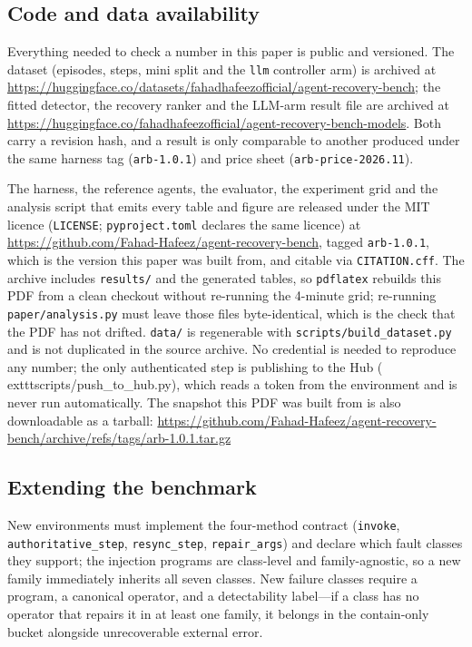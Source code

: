 \subsection{Code and data availability}

Everything needed to check a number in this paper is public and versioned. The dataset
(episodes, steps, mini split and the \texttt{llm} controller arm) is archived at
\url{https://huggingface.co/datasets/fahadhafeezofficial/agent-recovery-bench}; the fitted
detector, the recovery ranker and the LLM-arm result file are archived at
\url{https://huggingface.co/fahadhafeezofficial/agent-recovery-bench-models}. Both carry a
revision hash, and a result is only comparable to another produced under the same harness tag
(\texttt{arb-1.0.1}) and price sheet (\texttt{arb-price-2026.11}).

The harness, the reference agents, the evaluator, the experiment grid and the analysis script
that emits every table and figure are released under the MIT licence (\texttt{LICENSE};
\texttt{pyproject.toml} declares the same licence) at
\url{https://github.com/Fahad-Hafeez/agent-recovery-bench}, tagged \texttt{arb-1.0.1}, which is the version this paper was built from, and citable via
\texttt{CITATION.cff}. The archive
includes \texttt{results/} and the generated tables, so \texttt{pdflatex} rebuilds this PDF
from a clean checkout without re-running the 4-minute grid; re-running
\texttt{paper/analysis.py} must leave those files byte-identical, which is the check that the
PDF has not drifted. \texttt{data/} is regenerable with \texttt{scripts/build\_dataset.py}
and is not duplicated in the source archive. No credential is needed to reproduce any number;
the only authenticated step is publishing to the Hub (	exttt{scripts/push\_to\_hub.py}), which
reads a token from the environment and is never run automatically. The snapshot this PDF was
built from is also downloadable as a tarball:
\url{https://github.com/Fahad-Hafeez/agent-recovery-bench/archive/refs/tags/arb-1.0.1.tar.gz}

\subsection{Extending the benchmark}

New environments must implement the four-method contract (\texttt{invoke},
\texttt{authoritative\_step}, \texttt{resync\_step}, \texttt{repair\_args}) and declare which fault
classes they support; the injection programs are class-level and family-agnostic, so a new family
immediately inherits all seven classes. New failure classes require a program, a canonical operator,
and a detectability label---if a class has no operator that repairs it in at least one family, it
belongs in the contain-only bucket alongside unrecoverable external error.
